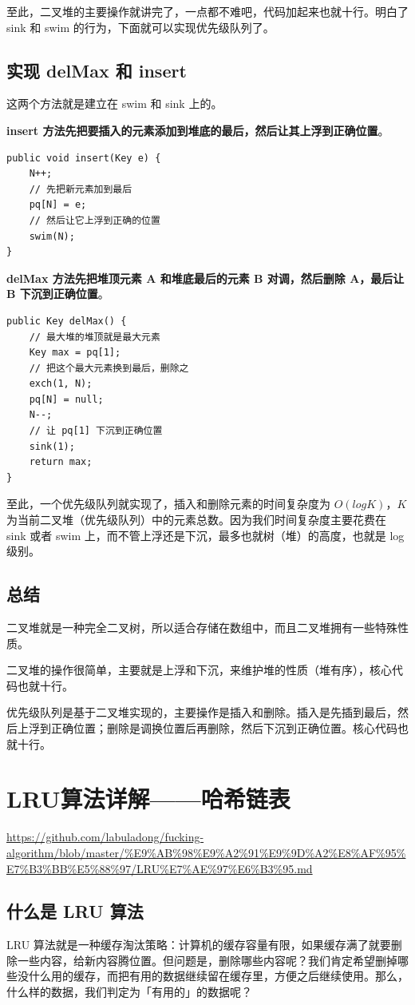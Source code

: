 \documentclass[12pt]{article}
\begin{document}
至此，二叉堆的主要操作就讲完了，一点都不难吧，代码加起来也就十行。明白了 sink 和 swim 的行为，下面就可以实现优先级队列了。

\subsection{实现 delMax 和 insert}
这两个方法就是建立在 swim 和 sink 上的。

\textbf{insert 方法先把要插入的元素添加到堆底的最后，然后让其上浮到正确位置}。
\begin{lstlisting}
public void insert(Key e) {
    N++;
    // 先把新元素加到最后
    pq[N] = e;
    // 然后让它上浮到正确的位置
    swim(N);
}
\end{lstlisting}

\textbf{delMax 方法先把堆顶元素 A 和堆底最后的元素 B 对调，然后删除 A，最后让 B 下沉到正确位置}。
\begin{lstlisting}
public Key delMax() {
    // 最大堆的堆顶就是最大元素
    Key max = pq[1];
    // 把这个最大元素换到最后，删除之
    exch(1, N);
    pq[N] = null;
    N--;
    // 让 pq[1] 下沉到正确位置
    sink(1);
    return max;
}
\end{lstlisting}

至此，一个优先级队列就实现了，插入和删除元素的时间复杂度为 $O(logK)$，$K$ 为当前二叉堆（优先级队列）中的元素总数。因为我们时间复杂度主要花费在 sink 或者 swim 上，而不管上浮还是下沉，最多也就树（堆）的高度，也就是 log 级别。

\subsection{总结}
二叉堆就是一种完全二叉树，所以适合存储在数组中，而且二叉堆拥有一些特殊性质。

二叉堆的操作很简单，主要就是上浮和下沉，来维护堆的性质（堆有序），核心代码也就十行。

优先级队列是基于二叉堆实现的，主要操作是插入和删除。插入是先插到最后，然后上浮到正确位置；删除是调换位置后再删除，然后下沉到正确位置。核心代码也就十行。

\section{LRU算法详解——哈希链表}
\url{https://github.com/labuladong/fucking-algorithm/blob/master/%E9%AB%98%E9%A2%91%E9%9D%A2%E8%AF%95%E7%B3%BB%E5%88%97/LRU%E7%AE%97%E6%B3%95.md}
\subsection{什么是 LRU 算法}
LRU 算法就是一种缓存淘汰策略：计算机的缓存容量有限，如果缓存满了就要删除一些内容，给新内容腾位置。但问题是，删除哪些内容呢？我们肯定希望删掉哪些没什么用的缓存，而把有用的数据继续留在缓存里，方便之后继续使用。那么，什么样的数据，我们判定为「有用的」的数据呢？
\end{document}
